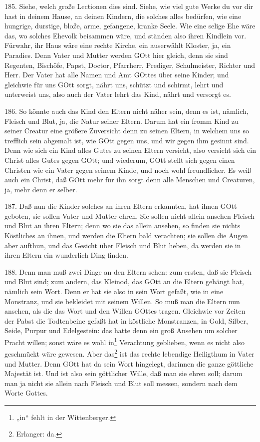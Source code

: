 185. Siehe, welch große Lectionen dies sind. Siehe, wie viel gute Werke du vor dir hast in deinem Hause, an deinen Kindern, die solches alles bedürfen, wie eine hungrige, durstige, bloße, arme, gefangene, kranke Seele. Wie eine selige Ehe wäre das, wo solches Ehevolk beisammen wäre, und ständen also ihren Kindlein vor. Fürwahr, ihr Haus wäre eine rechte Kirche, ein auserwählt Kloster, ja, ein Paradies. Denn Vater und Mutter werden GOtt hier gleich, denn sie sind Regenten, Bischöfe, Papst, Doctor, Pfarrherr, Prediger, Schulmeister, Richter und Herr. Der Vater hat alle Namen und Amt GOttes über seine Kinder; und gleichwie für uns GOtt sorgt, nährt uns, schützt und schirmt, lehrt und unterweist uns, also auch der Vater lehrt das Kind, nährt und versorgt es.

186. So könnte auch das Kind den Eltern nicht näher sein, denn es ist, nämlich, Fleisch und Blut, ja, die Natur seiner Eltern. Darum hat ein fromm Kind zu seiner Creatur eine größere Zuversicht denn zu seinen Eltern, in welchem uns so trefflich sein abgemalt ist, wie GOtt gegen uns, und wir gegen ihm gesinnt sind. Denn wie sich ein Kind alles Gutes zu seinen Eltern versieht, also versieht sich ein Christ alles Gutes gegen GOtt; und wiederum, GOtt stellt sich gegen einen Christen wie ein Vater gegen seinem Kinde, und noch wohl freundlicher. Es weiß auch ein Christ, daß GOtt mehr für ihn sorgt denn alle Menschen und Creaturen, ja, mehr denn er selber.

187. Daß nun die Kinder solches an ihren Eltern erkannten, hat ihnen GOtt geboten, sie sollen Vater und Mutter ehren. Sie sollen nicht allein ansehen Fleisch und Blut an ihren Eltern; denn wo sie das allein ansehen, so finden sie nichts Köstliches an ihnen, und werden die Eltern bald verachten; sie sollen die Augen aber aufthun, und das Gesicht über Fleisch und Blut heben, da werden sie in ihren Eltern ein wunderlich Ding finden.

188. Denn man muß zwei Dinge an den Eltern sehen: zum ersten, daß sie Fleisch und Blut sind; zum andern, das Kleinod, das GOtt an die Eltern gehängt hat, nämlich sein Wort. Denn er hat sie also in sein Wort gefaßt, wie in eine Monstranz, und sie bekleidet mit seinem Willen. So muß man die Eltern nun ansehen, als die das Wort und den Willen GOttes tragen. Gleichwie vor Zeiten der Pabst die Todtenbeine gefaßt hat in köstliche Monstranzen, in Gold, Silber, Seide, Purpur und Edelgestein: das hatte denn ein groß Ansehen um solcher Pracht willen; sonst wäre es wohl in\footnote{„in“ fehlt in der Wittenberger.} Verachtung geblieben, wenn es nicht also geschmückt wäre gewesen. Aber das\footnote{Erlanger: da.} ist das rechte lebendige Heiligthum in Vater und Mutter. Denn GOtt hat da sein Wort hingelegt, darinnen die ganze göttliche Majestät ist. Und ist also sein göttlicher Wille, daß man sie ehren soll; darum man ja nicht sie allein nach Fleisch und Blut soll messen, sondern nach dem Worte Gottes.

